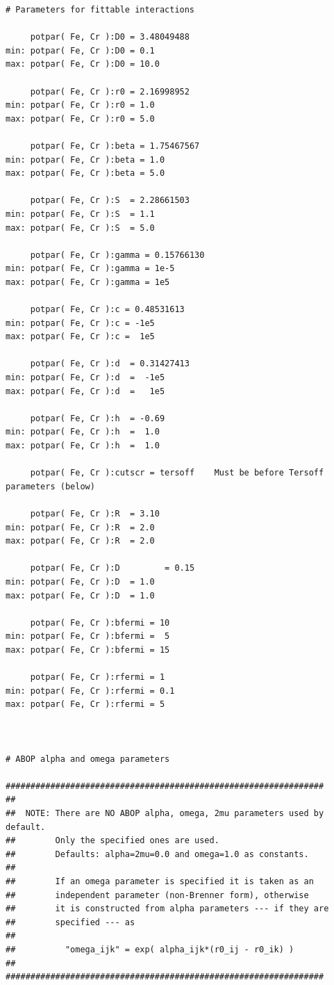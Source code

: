 \documentclass[a4paper,12pt,pdftex,onecolumn]{article}
\begin{document}
\begin{Verbatim}[fontsize=\relsize{-1},frame=single]
# Parameters for fittable interactions

     potpar( Fe, Cr ):D0 = 3.48049488
min: potpar( Fe, Cr ):D0 = 0.1
max: potpar( Fe, Cr ):D0 = 10.0

     potpar( Fe, Cr ):r0 = 2.16998952
min: potpar( Fe, Cr ):r0 = 1.0
max: potpar( Fe, Cr ):r0 = 5.0

     potpar( Fe, Cr ):beta = 1.75467567
min: potpar( Fe, Cr ):beta = 1.0
max: potpar( Fe, Cr ):beta = 5.0

     potpar( Fe, Cr ):S  = 2.28661503
min: potpar( Fe, Cr ):S  = 1.1
max: potpar( Fe, Cr ):S  = 5.0

     potpar( Fe, Cr ):gamma = 0.15766130
min: potpar( Fe, Cr ):gamma = 1e-5
max: potpar( Fe, Cr ):gamma = 1e5

     potpar( Fe, Cr ):c = 0.48531613
min: potpar( Fe, Cr ):c = -1e5
max: potpar( Fe, Cr ):c =  1e5

     potpar( Fe, Cr ):d  = 0.31427413
min: potpar( Fe, Cr ):d  =  -1e5
max: potpar( Fe, Cr ):d  =   1e5

     potpar( Fe, Cr ):h  = -0.69
min: potpar( Fe, Cr ):h  =  1.0
max: potpar( Fe, Cr ):h  =  1.0

     potpar( Fe, Cr ):cutscr = tersoff    Must be before Tersoff parameters (below)

     potpar( Fe, Cr ):R  = 3.10
min: potpar( Fe, Cr ):R  = 2.0
max: potpar( Fe, Cr ):R  = 2.0

     potpar( Fe, Cr ):D         = 0.15
min: potpar( Fe, Cr ):D  = 1.0
max: potpar( Fe, Cr ):D  = 1.0

     potpar( Fe, Cr ):bfermi = 10
min: potpar( Fe, Cr ):bfermi =  5
max: potpar( Fe, Cr ):bfermi = 15

     potpar( Fe, Cr ):rfermi = 1
min: potpar( Fe, Cr ):rfermi = 0.1
max: potpar( Fe, Cr ):rfermi = 5



# ABOP alpha and omega parameters

################################################################
##
##  NOTE: There are NO ABOP alpha, omega, 2mu parameters used by default.
##        Only the specified ones are used.
##        Defaults: alpha=2mu=0.0 and omega=1.0 as constants.
##
##        If an omega parameter is specified it is taken as an
##        independent parameter (non-Brenner form), otherwise
##        it is constructed from alpha parameters --- if they are
##        specified --- as
##
##          "omega_ijk" = exp( alpha_ijk*(r0_ij - r0_ik) )
##
################################################################



\end{Verbatim}
\end{document}
